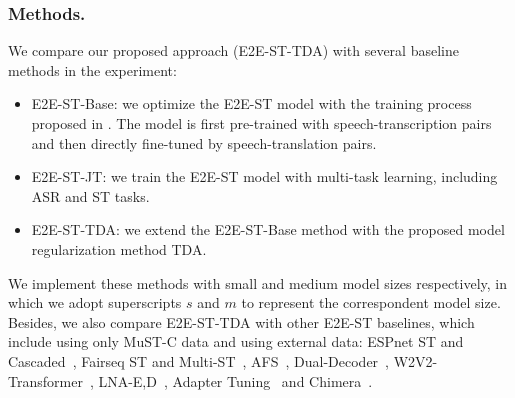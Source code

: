 \documentclass[letterpaper]{article} %
\begin{document}
\subsubsection{Methods.}
We compare our proposed approach (E2E-ST-TDA) with several baseline methods in the experiment:
\begin{itemize}
    \item E2E-ST-Base: we optimize the E2E-ST model with the training process proposed in \citet{Wang2020FairseqSF}.
    The model is first pre-trained with speech-transcription pairs and then directly fine-tuned by speech-translation pairs.
    \item E2E-ST-JT: we train the E2E-ST model with multi-task learning, including ASR and ST tasks.
    \item E2E-ST-TDA: we extend the E2E-ST-Base method with the proposed model regularization method TDA.

\end{itemize}
We implement these methods with small and medium model sizes respectively, in which we adopt superscripts $s$ and $m$ to represent the correspondent model size.
Besides, we also compare E2E-ST-TDA with other E2E-ST baselines, which include using only MuST-C data and using external data:
ESPnet ST and Cascaded~\cite{Inaguma2020ESPnetSTAS}, Fairseq ST and Multi-ST~\cite{Wang2020FairseqSF}, AFS~\cite{Zhang2020AdaptiveFS}, Dual-Decoder~\cite{Le2020DualdecoderTF}, W2V2-Transformer~\cite{Han2021LearningSS}, LNA-E,D~\cite{Li2021MultilingualST}, Adapter Tuning~\cite{Le2021LightweightAT} and Chimera~\cite{Han2021LearningSS}.
\end{document}

